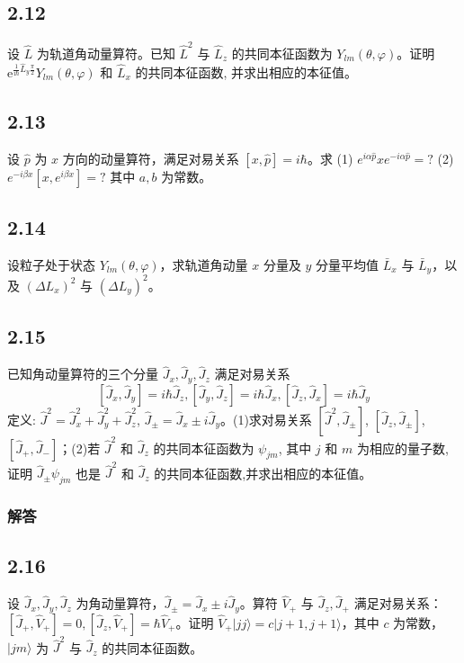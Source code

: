\newpage
\subsection{2.12}
设 $\hat{L}$ 为轨道角动量算符。已知 $\hat{L}^2$ 与 $\hat{L}_z$ 的共同本征函数为 $Y_{lm} (\theta, \varphi)$。证明 $\mathrm{e}^{\frac{1}{\mathrm{i}\hbar}\hat{L}_y\frac{\pi}{2}}Y_{lm}(\theta ,\varphi )$ 和 $\hat{L}_x$ 的共同本征函数, 并求出相应的本征值。


\newpage
\subsection{2.13}
设 $\hat{p}$ 为 $x$ 方向的动量算符，满足对易关系 $[x, \hat{p}] = i\hbar$。求 (1) $e^{i\alpha \hat{p}} x e^{-i\alpha \hat{p}} = ?$ (2) $e^{-i\beta x} [x, e^{i\beta x}] = ?$ 其中 $a, b$ 为常数。


\newpage
\subsection{2.14}
设粒子处于状态 $Y_{lm}(\theta, \varphi)$，求轨道角动量 $x$ 分量及 $y$ 分量平均值 $\bar{L}_x$ 与 $\bar{L}_y$，以及 $(\Delta L_x)^2$ 与 $(\Delta L_y)^2$。

\newpage
\subsection{2.15}
已知角动量算符的三个分量 $\hat{J}_x, \hat{J}_y, \hat{J}_z$ 满足对易关系 
$$[\hat{J}_x, \hat{J}_y] = i\hbar \hat{J}_z, [\hat{J}_y, \hat{J}_z] = i\hbar \hat{J}_x, [\hat{J}_z, \hat{J}_x] = i\hbar \hat{J}_y$$
定义: $\hat{J}^2 = \hat{J}_x^2 + \hat{J}_y^2 + \hat{J}_z^2$, $\hat{J}_{\pm} = \hat{J}_x \pm i \hat{J}_y$。(1)求对易关系 $[\hat{J}^2, \hat{J}_{\pm}]$, $[\hat{J}_z, \hat{J}_{\pm}]$, $[\hat{J}_+, \hat{J}_-]$；(2)若 $\hat{J}^2$ 和 $\hat{J}_z$ 的共同本征函数为 $\psi_{jm}$, 其中 $j$ 和 $m$ 为相应的量子数, 证明 $\hat{J}_{\pm} \psi_{jm}$ 也是 $\hat{J}^2$ 和 $\hat{J}_z$ 的共同本征函数,并求出相应的本征值。

\subsubsection{解答}

\newpage
\subsection{2.16}
设 $\hat{J}_x, \hat{J}_y, \hat{J}_z$ 为角动量算符，$\hat{J}_{\pm} = \hat{J}_x \pm i\hat{J}_y$。算符 $\hat{V}_+$ 与 $\hat{J}_z, \hat{J}_+$ 满足对易关系：$[\hat{J}_+, \hat{V}_+] = 0, [\hat{J}_z, \hat{V}_+] = \hbar \hat{V}_+$。证明 $\hat{V}_+ | j j \rangle = c | j + 1, j + 1 \rangle$，其中 $c$ 为常数，$|jm\rangle$ 为 $\hat{J}^2$ 与 $\hat{J}_z$ 的共同本征函数。

